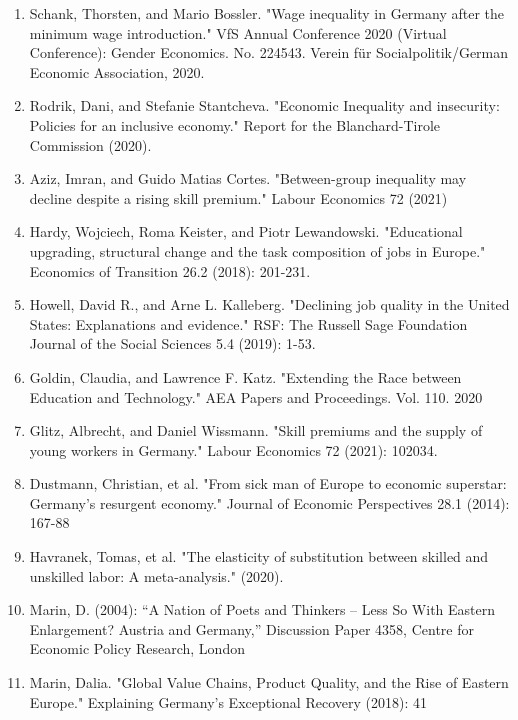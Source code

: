 \documentclass{article}
\begin{document}
\begin{enumerate}
\item Schank, Thorsten, and Mario Bossler. "Wage inequality in Germany after the minimum wage introduction." VfS Annual Conference 2020 (Virtual Conference): Gender Economics. No. 224543. Verein für Socialpolitik/German Economic Association, 2020.

\item Rodrik, Dani, and Stefanie Stantcheva. "Economic Inequality and insecurity: Policies for an inclusive economy." Report for the Blanchard-Tirole Commission (2020).

\item Aziz, Imran, and Guido Matias Cortes. "Between-group inequality may decline despite a rising skill premium." Labour Economics 72 (2021)

\item Hardy, Wojciech, Roma Keister, and Piotr Lewandowski. "Educational upgrading, structural change and the task composition of jobs in Europe." Economics of Transition 26.2 (2018): 201-231.

\item Howell, David R., and Arne L. Kalleberg. "Declining job quality in the United States: Explanations and evidence." RSF: The Russell Sage Foundation Journal of the Social Sciences 5.4 (2019): 1-53.

\item Goldin, Claudia, and Lawrence F. Katz. "Extending the Race between Education and Technology." AEA Papers and Proceedings. Vol. 110. 2020

\item Glitz, Albrecht, and Daniel Wissmann. "Skill premiums and the supply of young workers in Germany." Labour Economics 72 (2021): 102034.

\item Dustmann, Christian, et al. "From sick man of Europe to economic superstar: Germany's resurgent economy." Journal of Economic Perspectives 28.1 (2014): 167-88

\item Havranek, Tomas, et al. "The elasticity of substitution between skilled and unskilled labor: A meta-analysis." (2020).

\item Marin, D. (2004): “A Nation of Poets and Thinkers – Less So With Eastern Enlargement? Austria and Germany,” Discussion Paper 4358, Centre for Economic Policy Research, London

\item Marin, Dalia. "Global Value Chains, Product Quality, and the Rise of Eastern Europe." Explaining Germany’s Exceptional Recovery (2018): 41


\end{enumerate}
\end{document}
